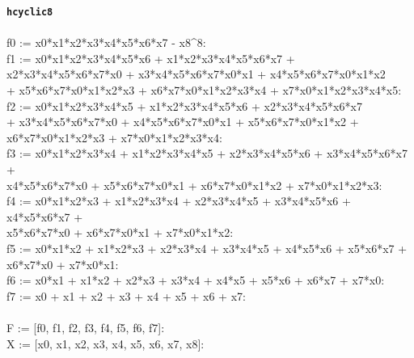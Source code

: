 \documentclass[letterpaper,12pt,titlepage,oneside,final]{book}
\newenvironment{codefont}{\footnotesize\ttfamily}{\par}
\begin{document}
\begin{appendices}
\noindent\textbf{\texttt{hcyclic8}}\\\\
\noindent\begin{codefont}
 f0 := x0*x1*x2*x3*x4*x5*x6*x7 - x8\^{}8:
\\
f1 := x0*x1*x2*x3*x4*x5*x6 + x1*x2*x3*x4*x5*x6*x7 + \\
x2*x3*x4*x5*x6*x7*x0 + x3*x4*x5*x6*x7*x0*x1 + x4*x5*x6*x7*x0*x1*x2 \\
+ x5*x6*x7*x0*x1*x2*x3 + x6*x7*x0*x1*x2*x3*x4 + x7*x0*x1*x2*x3*x4*x5:
\\
f2 := x0*x1*x2*x3*x4*x5 + x1*x2*x3*x4*x5*x6 + x2*x3*x4*x5*x6*x7 \\
+ x3*x4*x5*x6*x7*x0 + x4*x5*x6*x7*x0*x1 + x5*x6*x7*x0*x1*x2 + \\
x6*x7*x0*x1*x2*x3 + x7*x0*x1*x2*x3*x4:
\\
f3 := x0*x1*x2*x3*x4 + x1*x2*x3*x4*x5 + x2*x3*x4*x5*x6 + x3*x4*x5*x6*x7 + \\
x4*x5*x6*x7*x0 + x5*x6*x7*x0*x1 + x6*x7*x0*x1*x2 + x7*x0*x1*x2*x3:
\\
f4 := x0*x1*x2*x3 + x1*x2*x3*x4 + x2*x3*x4*x5 + x3*x4*x5*x6 + x4*x5*x6*x7 + \\
x5*x6*x7*x0 + x6*x7*x0*x1 + x7*x0*x1*x2:
\\
f5 := x0*x1*x2 + x1*x2*x3 + x2*x3*x4 + x3*x4*x5 + x4*x5*x6 + x5*x6*x7 + \\
x6*x7*x0 + x7*x0*x1:
\\
f6 := x0*x1 + x1*x2 + x2*x3 + x3*x4 + x4*x5 + x5*x6 + x6*x7 + x7*x0:
\\
f7 := x0 + x1 + x2 + x3 + x4 + x5 + x6 + x7:
\\
\\
F := [f0, f1, f2, f3, f4, f5, f6, f7]:
\\
X := [x0, x1, x2, x3, x4, x5, x6, x7, x8]:\\
\end{codefont}


\end{appendices}
\end{document}
